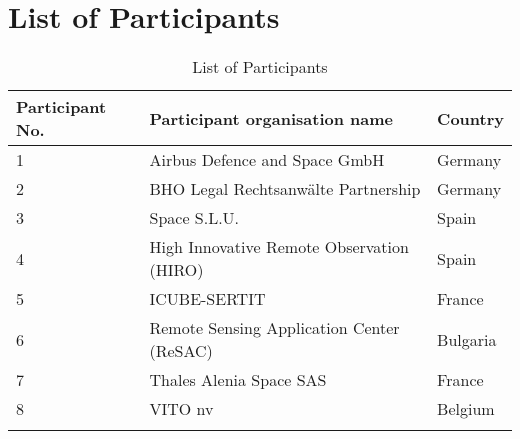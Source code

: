 \chapter{List of Participants}

\begin{longtable}[H]{l p{9cm} p{2cm}}
	
	\toprule[2pt]
	
	\textbf{Participant No.} & \textbf{Participant organisation name} & \textbf{Country} \\
	
	\midrule[1.5pt] 
	\endhead
	
	1 & Airbus Defence and Space GmbH & Germany \vspace{0.2cm} \\
	
	\midrule

	2 & BHO Legal Rechtsanwälte Partnership & Germany \vspace{0.2cm} \\
	
	\midrule
	
	3 &  Space S.L.U. & Spain \vspace{0.2cm} \\

	\midrule

 	4 & High Innovative Remote Observation (HIRO) & Spain \vspace{0.2cm} \\
 	
 	\midrule
 	
 	5 & ICUBE-SERTIT & France \vspace{0.2cm} \\
 	
 	\midrule
 	
 	6 & Remote Sensing Application Center (ReSAC) & Bulgaria \vspace{0.2cm} \\
 	
 	\midrule
 	
 	7 & Thales Alenia Space SAS & France \vspace{0.2cm} \\
 	
 	\midrule
 	
 	8 & VITO nv & Belgium \vspace{0.2cm} \\
	
	\bottomrule[2pt]
	
	\caption{List of Participants}
	\label{Participants}
\end{longtable}

